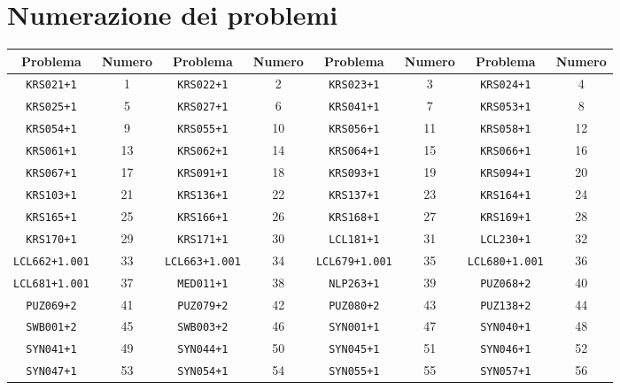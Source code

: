 \documentclass[./main.tex]{subfiles}
\begin{document}
\vspace{-2cm}
\chapter{Numerazione dei problemi}

\begin{table}[H]
\begin{tabularx}{\textwidth}{|c|c|c|c|c|c|c|c|}
\hline
Problema & Numero & Problema & Numero & Problema & Numero & Problema & Numero \\
\hline
\texttt{KRS021+1} & 1 & \texttt{KRS022+1} & 2 & \texttt{KRS023+1} & 3 & \texttt{KRS024+1} & 4\\
\hline
\texttt{KRS025+1} & 5 & \texttt{KRS027+1} & 6 & \texttt{KRS041+1} & 7 & \texttt{KRS053+1} & 8\\
\hline
\texttt{KRS054+1} & 9 & \texttt{KRS055+1} & 10 & \texttt{KRS056+1} & 11 & \texttt{KRS058+1} & 12\\
\hline
\texttt{KRS061+1} & 13 & \texttt{KRS062+1} & 14 & \texttt{KRS064+1} & 15 & \texttt{KRS066+1} & 16\\
\hline
\texttt{KRS067+1} & 17 & \texttt{KRS091+1} & 18 & \texttt{KRS093+1} & 19 & \texttt{KRS094+1} & 20\\
\hline
\texttt{KRS103+1} & 21 & \texttt{KRS136+1} & 22 & \texttt{KRS137+1} & 23 & \texttt{KRS164+1} & 24\\
\hline
\texttt{KRS165+1} & 25 & \texttt{KRS166+1} & 26 & \texttt{KRS168+1} & 27 & \texttt{KRS169+1} & 28\\
\hline
\texttt{KRS170+1} & 29 & \texttt{KRS171+1} & 30 & \texttt{LCL181+1} & 31 & \texttt{LCL230+1} & 32\\
\hline
\texttt{LCL662+1.001} & 33 & \texttt{LCL663+1.001} & 34 & \texttt{LCL679+1.001} & 35 & \texttt{LCL680+1.001} & 36\\
\hline
\texttt{LCL681+1.001} & 37 & \texttt{MED011+1} & 38 & \texttt{NLP263+1} & 39 & \texttt{PUZ068+2} & 40\\
\hline
\texttt{PUZ069+2} & 41 & \texttt{PUZ079+2} & 42 & \texttt{PUZ080+2} & 43 & \texttt{PUZ138+2} & 44\\
\hline
\texttt{SWB001+2} & 45 & \texttt{SWB003+2} & 46 & \texttt{SYN001+1} & 47 & \texttt{SYN040+1} & 48\\
\hline
\texttt{SYN041+1} & 49 & \texttt{SYN044+1} & 50 & \texttt{SYN045+1} & 51 & \texttt{SYN046+1} & 52\\
\hline
\texttt{SYN047+1} & 53 & \texttt{SYN054+1} & 54 & \texttt{SYN055+1} & 55 & \texttt{SYN057+1} & 56\\

\end{tabularx}
\end{table}
\end{document}
